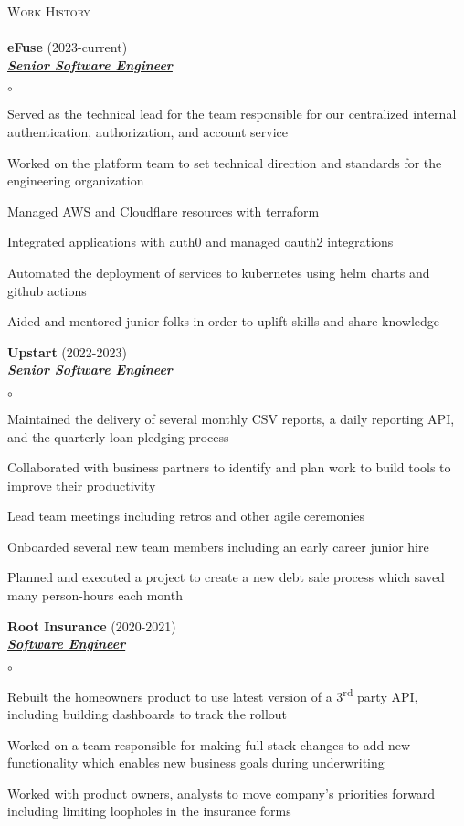 \documentclass{article}
\newcommand{\lineunder}{\vspace*{-8pt} \\ \hspace*{-18pt} \hrulefill{} \\}
\newcommand{\header}[1]{{\hspace*{-15pt}\vspace*{6pt} \textsc{#1}} \vspace*{-6pt} \lineunder}
\newcommand{\employer}[3]{{ \textbf{#1} (#2)\\ \underline{\textbf{\emph{#3}}}\\  }}
\newenvironment{achievements}{\begin{list}{$\circ$}{\topsep 0pt \itemsep -2pt}}{\vspace*{4pt}\end{list}}
\newcommand{\ts}{\textsuperscript}
\begin{document}
\header{Work History}
\employer{eFuse}{2023-current}{Senior Software Engineer}
	\begin{achievements}
	\item Served as the technical lead for the team responsible for our centralized internal authentication, authorization, and account service
	\item Worked on the platform team to set technical direction and standards for the engineering organization
	\item Managed AWS and Cloudflare resources with terraform
	\item Integrated applications with auth0 and managed oauth2 integrations
	\item Automated the deployment of services to kubernetes using helm charts and github actions
	\item Aided and mentored junior folks in order to uplift skills and share knowledge
	\end{achievements}
\employer{Upstart}{2022-2023}{Senior Software Engineer}
	\begin{achievements}
	\item Maintained the delivery of several monthly CSV reports, a daily reporting API, and the quarterly loan pledging process
	\item Collaborated with business partners to identify and plan work to build tools to improve their productivity
	\item Lead team meetings including retros and other agile ceremonies
	\item Onboarded several new team members including an early career junior hire
	\item Planned and executed a project to create a new debt sale process which saved many person-hours each month
	\end{achievements}
\employer{Root Insurance}{2020-2021}{Software Engineer}
	\begin{achievements}
	\item Rebuilt the homeowners product to use latest version of a 3\ts{rd} party API, including building dashboards to track the rollout
	\item Worked on a team responsible for making full stack changes to add new functionality which enables new business goals during underwriting
	\item Worked with product owners, analysts to move company's priorities forward including limiting loopholes in the insurance forms
	\end{achievements}
\end{document}
